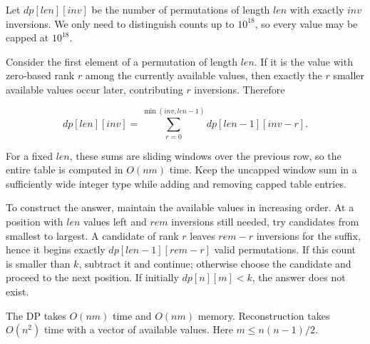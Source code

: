 Let $dp[len][inv]$ be the number of permutations of length $len$ with exactly $inv$ inversions. We only need to distinguish counts up to $10^{18}$, so every value may be capped at $10^{18}$.

Consider the first element of a permutation of length $len$. If it is the value with zero-based rank $r$ among the currently available values, then exactly the $r$ smaller available values occur later, contributing $r$ inversions. Therefore

$$dp[len][inv] = \sum_{r=0}^{\min(inv,len-1)} dp[len-1][inv-r].$$

For a fixed $len$, these sums are sliding windows over the previous row, so the entire table is computed in $O(nm)$ time. Keep the uncapped window sum in a sufficiently wide integer type while adding and removing capped table entries.

To construct the answer, maintain the available values in increasing order. At a position with $len$ values left and $rem$ inversions still needed, try candidates from smallest to largest. A candidate of rank $r$ leaves $rem-r$ inversions for the suffix, hence it begins exactly $dp[len-1][rem-r]$ valid permutations. If this count is smaller than $k$, subtract it and continue; otherwise choose the candidate and proceed to the next position. If initially $dp[n][m] < k$, the answer does not exist.

The DP takes $O(nm)$ time and $O(nm)$ memory. Reconstruction takes $O(n^2)$ time with a vector of available values. Here $m \le n(n-1)/2$.
